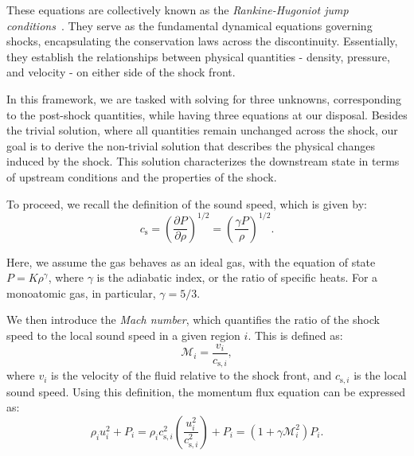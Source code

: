 These equations are collectively known as the \emph{Rankine-Hugoniot jump conditions}~\cite{}. They serve as the fundamental dynamical equations governing shocks, encapsulating the conservation laws across the discontinuity. Essentially, they establish the relationships between physical quantities - density, pressure, and velocity - on either side of the shock front.

In this framework, we are tasked with solving for three unknowns, corresponding to the post-shock quantities, while having three equations at our disposal. Besides the trivial solution, where all quantities remain unchanged across the shock, our goal is to derive the non-trivial solution that describes the physical changes induced by the shock. This solution characterizes the downstream state in terms of upstream conditions and the properties of the shock.

To proceed, we recall the definition of the sound speed, which is given by:
%
\begin{equation}
c_{\text{s}} = \left( \frac{\partial P}{\partial \rho} \right)^{1/2} = \left(\frac{\gamma P}{\rho}\right)^{1/2}.
\end{equation}

Here, we assume the gas behaves as an ideal gas, with the equation of state \( P = K \rho^\gamma \), where \( \gamma \) is the adiabatic index, or the ratio of specific heats. For a monoatomic gas, in particular, \( \gamma = 5/3 \).

We then introduce the \emph{Mach number}, which quantifies the ratio of the shock speed to the local sound speed in a given region \( i \). This is defined as:
%
\begin{equation}
\mathcal{M}_i = \frac{v_i}{c_{\text{s},i}},
\end{equation}
%
where \( v_i \) is the velocity of the fluid relative to the shock front, and \( c_{\text{s},i} \) is the local sound speed. Using this definition, the momentum flux equation can be expressed as:
%
\begin{equation}
\rho_i u_i^2 + P_i = \rho_i c_{\text{s}, i}^2 \left( \frac{u_i^2}{c_{\text{s},i}^2} \right) + P_i = (1 + \gamma \mathcal{M}_i^2) P_i.
\end{equation}

